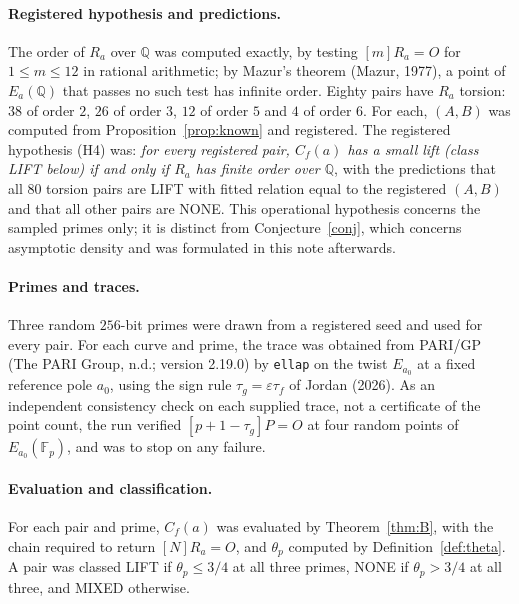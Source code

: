 \documentclass[11pt,a4paper]{article}
\numberwithin{equation}{section}
\theoremstyle{plain}
\theoremstyle{definition}
\newcommand{\F}{\mathbb{F}}
\newcommand{\Q}{\mathbb{Q}}
\newcommand{\eps}{\varepsilon}
\begin{document}
\paragraph{Registered hypothesis and predictions.} The order of $R_a$ over $\Q$ was computed exactly, by testing $[m]R_a=O$ for $1\le m\le12$ in rational arithmetic; by Mazur's theorem (Mazur, 1977), a point of $E_a(\Q)$ that passes no such test has infinite order. Eighty pairs have $R_a$ torsion: $38$ of order $2$, $26$ of order $3$, $12$ of order $5$ and $4$ of order $6$. For each, $(A,B)$ was computed from Proposition~\ref{prop:known} and registered. The registered hypothesis (H4) was: \emph{for every registered pair, $C_f(a)$ has a small lift (class LIFT below) if and only if $R_a$ has finite order over $\Q$}, with the predictions that all $80$ torsion pairs are LIFT with fitted relation equal to the registered $(A,B)$ and that all other pairs are NONE. This operational hypothesis concerns the sampled primes only; it is distinct from Conjecture~\ref{conj}, which concerns asymptotic density and was formulated in this note afterwards.

\paragraph{Primes and traces.} Three random $256$-bit primes were drawn from a registered seed and used for every pair. For each curve and prime, the trace was obtained from PARI/GP (The PARI Group, n.d.; version 2.19.0) by \texttt{ellap} on the twist $E_{a_0}$ at a fixed reference pole $a_0$, using the sign rule $\tau_g=\eps\tau_f$ of Jordan (2026). As an independent consistency check on each supplied trace, not a certificate of the point count, the run verified $[p+1-\tau_g]P=O$ at four random points of $E_{a_0}(\F_p)$, and was to stop on any failure.

\paragraph{Evaluation and classification.} For each pair and prime, $C_f(a)$ was evaluated by Theorem~\ref{thm:B}, with the chain required to return $[N]R_a=O$, and $\theta_p$ computed by Definition~\ref{def:theta}. A pair was classed LIFT if $\theta_p\le3/4$ at all three primes, NONE if $\theta_p>3/4$ at all three, and MIXED otherwise.
\end{document}
